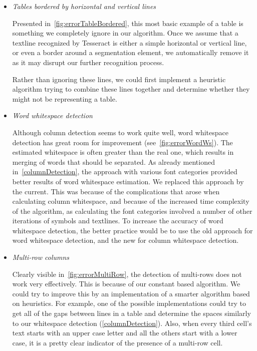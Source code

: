 \begin{itemize}
    \item \emph{Tables bordered by horizontal and vertical lines}
    
    Presented in~\cref{fig:errorTableBordered}, this most basic example of a table is something we completely ignore in our algorithm. Once we assume that a textline recognized by Tesseract is either a simple horizontal or vertical line, or even a border around a segmentation element, we automatically remove it as it may disrupt our further recognition process.
    
    Rather than ignoring these lines, we could first implement a heuristic algorithm trying to combine these lines together and determine whether they might not be representing a table.
    
    \item \emph{Word whitespace detection}

    Although column detection seems to work quite well, word whitespace detection has great room for improvement (see~\cref{fig:errorWordWs}). The estimated whitespace is often greater than the real one, which results in merging of words that should be separated. As already mentioned in~\cref{columnDetection}, the approach with various font categories provided better results of word whitespace estimation. We replaced this approach by the current. This was because of the complications that arose when calculating column whitespace, and because of the increased time complexity of the algorithm, as calculating the font categories involved a number of other iterations of symbols and textlines. To increase the accuracy of word whitespace detection, the better practice would be to use the old approach for word whitespace detection, and the new for column whitespace detection. 
    
    \item \emph{Multi-row columns}
    
    Clearly visible in~\cref{fig:errorMultiRow}, the detection of multi-rows does not work very effectively. This is because of our constant based algorithm. We could try to improve this by an implementation of a smarter algorithm based on heuristics. For example, one of the possible implementations could try to get all of the gaps between lines in a table and determine the spaces similarly to our whitespace detection (\cref{columnDetection}). Also, when every third cell's text starts with an upper case letter and all the others start with a lower case, it is a pretty clear indicator of the presence of a multi-row cell.
    

\end{itemize}

